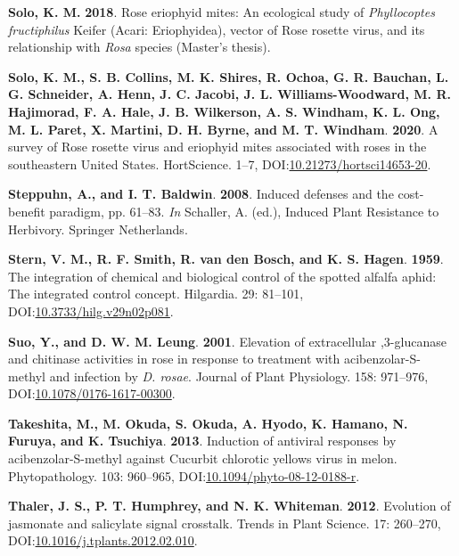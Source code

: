 \documentclass[12pt,final,CPage]{ufthesis}
\newlength{\cslhangindent}
\newenvironment{CSLReferences}[2] %
{%
	\setlength{\parindent}{0pt}
	\ifodd #1 \everypar{\setlength{\hangindent}{\cslhangindent}}\ignorespaces\fi
	\ifnum #2 > 0
	\setlength{\parskip}{#2\baselineskip}
	\fi
}%
{}
\begin{document}
{\begin{CSLReferences}{1}{0}
  \leavevmode{}%
  \textbf{Solo, K. M.} \textbf{2018}. Rose eriophyid mites: An ecological study of {\emph{Phyllocoptes fructiphilus}} {Keifer} {({Acari}: {Eriophyidea})}, vector of {Rose rosette virus}, and its relationship with {\emph{Rosa}} species (Master's thesis).

  \leavevmode{}%
  \textbf{Solo, K. M., S. B. Collins, M. K. Shires, R. Ochoa, G. R. Bauchan, L. G. Schneider, A. Henn, J. C. Jacobi, J. L. Williams-Woodward, M. R. Hajimorad, F. A. Hale, J. B. Wilkerson, A. S. Windham, K. L. Ong, M. L. Paret, X. Martini, D. H. Byrne, and M. T. Windham}. \textbf{2020}. A survey of {Rose rosette virus} and eriophyid mites associated with roses in the southeastern {United States}. {HortScience}. 1--7, DOI:\href{https://doi.org/10.21273/hortsci14653-20}{10.21273/hortsci14653-20}.

  \leavevmode{}%
  \textbf{Steppuhn, A., and I. T. Baldwin}. \textbf{2008}. Induced defenses and the cost-benefit paradigm, pp. 61--83. \emph{In} Schaller, A. (ed.), Induced Plant Resistance to Herbivory. Springer Netherlands.

  \leavevmode{}%
  \textbf{Stern, V. M., R. F. Smith, R. van den Bosch, and K. S. Hagen}. \textbf{1959}. The integration of chemical and biological control of the spotted alfalfa aphid: The integrated control concept. Hilgardia. 29: 81--101, DOI:\href{https://doi.org/10.3733/hilg.v29n02p081}{10.3733/hilg.v29n02p081}.

  \leavevmode{}%
  \textbf{Suo, Y., and D. W. M. Leung}. \textbf{2001}. Elevation of extracellular ,3-glucanase and chitinase activities in rose in response to treatment with acibenzolar-{S}-methyl and infection by {\emph{D. rosae}}. Journal of Plant Physiology. 158: 971--976, DOI:\href{https://doi.org/10.1078/0176-1617-00300}{10.1078/0176-1617-00300}.

  \leavevmode{}%
  \textbf{Takeshita, M., M. Okuda, S. Okuda, A. Hyodo, K. Hamano, N. Furuya, and K. Tsuchiya}. \textbf{2013}. Induction of antiviral responses by acibenzolar-{S}-methyl against {Cucurbit chlorotic yellows virus} in melon. Phytopathology{\textregistered}. 103: 960--965, DOI:\href{https://doi.org/10.1094/phyto-08-12-0188-r}{10.1094/phyto-08-12-0188-r}.

  \leavevmode{}%
  \textbf{Thaler, J. S., P. T. Humphrey, and N. K. Whiteman}. \textbf{2012}. Evolution of jasmonate and salicylate signal crosstalk. Trends in Plant Science. 17: 260--270, DOI:\href{https://doi.org/10.1016/j.tplants.2012.02.010}{10.1016/j.tplants.2012.02.010}.


\end{CSLReferences}}
\end{document}
